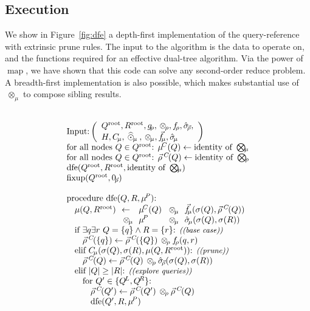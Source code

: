 \documentclass[times, leqno,twocolumn]{article}
\newcommand{\com}[1]{{\small \textit{((#1))}}}
\newcommand{\summary}{\hat{\sigma}}
\DeclareMathOperator*{\map}{map}
\newcommand{\fig}[1]{Figure~\ref{fig:#1}}
\newcommand{\psty}{}
\newcommand{\X}{\\ \psty}
\newcommand{\x}{\X \hspace{0.13in}}
\newcommand{\xx}{\X \hspace{0.26in}}
\newcommand{\xxx}{\X \hspace{0.39in}}
\newcommand{\kdroot}[1]{#1^{\text{root}}}
\newcommand{\kdleft}[1]{#1^{\!L}}
\newcommand{\kdright}[1]{#1^{\!R}}
\newcommand{\nameOp}[2]{\mathop{#1\nolimits\!\!_{#2}}}
\newcommand{\nameop}[2]{{\scriptstyle\:}#1_{\!#2}}
\newcommand{\myOp}[1]{\nameOp{\bigotimes}{#1}}
\newcommand{\myop}[1]{\nameop{\otimes}{#1}}
\newcommand{\letterqr}{\rho}
\newcommand{\Opqr}{\myOp{\letterqr}}
\newcommand{\opqr}{\myop{\letterqr}}
\newcommand{\fqr}{f_{\!\letterqr}}
\newcommand{\gqr}{g_{\!\letterqr}}
\newcommand{\letterqrv}{\vec{\rho}}
\newcommand{\deltaqrv}{\summary_{\!\letterqrv}}
\newcommand{\identqr}{0_{\!\letterqrv}}
\newcommand{\varqrv}{\letterqrv^{\:C\!}}
\newcommand{\lettermu}{\mu}
\newcommand{\inmu}{\mu}
\newcommand{\outopmu}{\:\widehat{\odot}_{\!\mu}\:}
\newcommand{\Opmu}{\myOp{\lettermu}}
\newcommand{\opmu}{\myop{\lettermu}}
\newcommand{\fmuv}{\vec{f_{\!\lettermu}}}
\newcommand{\deltamu}{\summary_{\!\lettermu}}
\newcommand{\canprunemu}{C_{\!\lettermu}}
\newcommand{\heurqr}{H}
\newcommand{\varmuchild}{\lettermu^{\!C}}
\newcommand{\varmuparent}{\lettermu^{\!P}}
\newcommand{\outstat}{\sigma}
\begin{document}
\subsection{Execution}

We show in \fig{dfe} a depth-first implementation of the query-reference with extrinsic prune rules.
The input to the algorithm is the data to operate on, and the functions required for an effective dual-tree algorithm.
Via the power of $\map$, we have shown that this code can solve any second-order reduce problem.
A breadth-first implementation is also possible, which makes substantial use of $\opmu$ to compose sibling results.

\begin{figure}
\[
  \begin{array}[t]{l}
    \\ \text{Input:}\left(
        \begin{array}[c]{l}\kdroot{Q}, \kdroot{R}, \gqr, \opqr, \fqr, \deltaqrv, \\ \heurqr, \canprunemu, \outopmu, \opmu, \fmuv, \deltamu\end{array}\right)
    \X \text{for all nodes } Q \in \kdroot{Q}\text{: } \varmuchild(Q) \gets \text{identity of }\Opmu
    \X \text{for all nodes } Q \in \kdroot{Q}\text{: } \varqrv(Q) \gets \text{identity of }\Opqr%
    \X \text{dfe}(\kdroot{Q}, \kdroot{R}, \text{identity of }\Opmu)
    \X \text{fixup}(\kdroot{Q}, \identqr)
    \X
    \X \text{procedure dfe}(Q, R, \varmuparent)\text{:}
    \x \!\!\!\begin{array}{lllll}
         \psty\inmu(Q,\kdroot{R}) &\psty\!\!\gets\!\!& \psty\varmuchild(Q) &\psty\!\!\opmu\!\!& \psty\fmuv(\outstat(Q), \varqrv(Q))
         \\              &\psty\!\!\opmu\!\!& \psty\varmuparent   &\psty\!\!\opmu\!\!& \psty\deltamu(\outstat(Q), \outstat(R))
       \end{array}
    \x \text{if } \exists q \exists r ~ Q = \{q\} \wedge R = \{r\}\text{: \com{base case}}
    \xx \varqrv(\{q\}) \gets \varqrv(\{Q\}) \opqr \fqr(q, r)
    \x \text{elif } \canprunemu(\outstat(Q), \outstat(R), \inmu(Q,\kdroot{R}))\text{: \com{prune}}
    \xx \varqrv(Q) \gets \varqrv(Q) \opqr \deltaqrv(\outstat(Q), \outstat(R))
    \x \text{elif } |Q| \geq |R|\text{: \com{explore queries}}
    \xx \text{for } Q' \in \{\kdleft{Q}, \kdright{Q}\}\text{:}
    \xxx \varqrv(Q') \gets \varqrv(Q') \opqr \varqrv(Q)
    \xxx \text{dfe}(Q', R, \varmuparent)

\end{array}\]
\end{figure}
\end{document}
